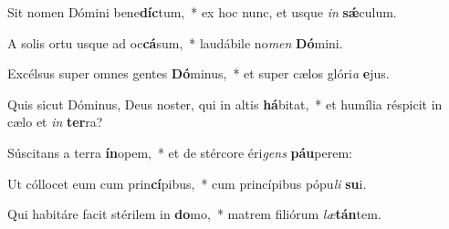 \item Sit nomen Dómini bene\textbf{díc}tum,~* ex hoc nunc, et usque \textit{in} \textbf{sǽ}culum.
\item A solis ortu usque ad oc\textbf{cá}sum,~* laudábile no\textit{men} \textbf{Dó}mini.
\item Excélsus super omnes gentes \textbf{Dó}minus,~* et super cælos glóri\textit{a} \textbf{e}jus.
\item Quis sicut Dóminus, Deus noster, qui in altis \textbf{há}bitat,~* et humília réspicit in cælo et \textit{in} \textbf{ter}ra?
\item Súscitans a terra \textbf{ín}opem,~* et de stércore éri\textit{gens} \textbf{páu}perem:
\item Ut cóllocet eum cum prin\textbf{cí}pibus,~* cum princípibus pópu\textit{li} \textbf{su}i.
\item Qui habitáre facit stérilem in \textbf{do}mo,~* matrem filiórum \textit{læ}\textbf{tán}tem.
